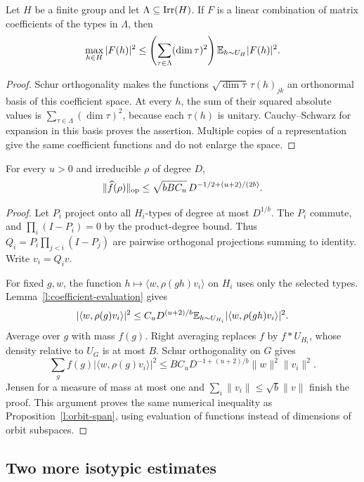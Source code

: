 \begin{lemma}\label{l:coefficient-evaluation}
Let $H$ be a finite group and let $\Lambda\subseteq\operatorname{Irr}(H)$. If $F$ is a linear combination of matrix coefficients of the types in $\Lambda$, then
\[
 \max_{h\in H}|F(h)|^2\le\left(\sum_{\tau\in\Lambda}(\dim\tau)^2\right)\mathbb E_{h\sim U_H}|F(h)|^2.
\]
\end{lemma}
\begin{proof}
Schur orthogonality makes the functions $\sqrt{\dim\tau}\,\tau(h)_{jk}$ an orthonormal basis of this coefficient space. At every $h$, the sum of their squared absolute values is $\sum_{\tau\in\Lambda}(\dim\tau)^2$, because each $\tau(h)$ is unitary. Cauchy--Schwarz for expansion in this basis proves the assertion. Multiple copies of a representation give the same coefficient functions and do not enlarge the space.
\end{proof}

\begin{proposition}\label{l:coefficient-operator}
For every $u>0$ and irreducible $\rho$ of degree $D$,
\[
 \|\widehat f(\rho)\|_{\mathrm{op}}\le\sqrt{bBC_u}\,D^{-1/2+(u+2)/(2b)}.
\]
\end{proposition}
\begin{proof}
Let $P_i$ project onto all $H_i$-types of degree at most $D^{1/b}$. The $P_i$ commute, and $\prod_i(I-P_i)=0$ by the product-degree bound. Thus $Q_i=P_i\prod_{j<i}(I-P_j)$ are pairwise orthogonal projections summing to identity. Write $v_i=Q_iv$.

For fixed $g,w$, the function $h\mapsto\langle w,\rho(gh)v_i\rangle$ on $H_i$ uses only the selected types. Lemma~\ref{l:coefficient-evaluation} gives
\[
 |\langle w,\rho(g)v_i\rangle|^2
 \le C_uD^{(u+2)/b}\mathbb E_{h\sim U_{H_i}}|\langle w,\rho(gh)v_i\rangle|^2.
\]
Average over $g$ with mass $f(g)$. Right averaging replaces $f$ by $f*U_{H_i}$, whose density relative to $U_G$ is at most $B$. Schur orthogonality on $G$ gives
\[
 \sum_gf(g)|\langle w,\rho(g)v_i\rangle|^2
 \le BC_uD^{-1+(u+2)/b}\|w\|^2\|v_i\|^2.
\]
Jensen for a measure of mass at most one and $\sum_i\|v_i\|\le\sqrt b\|v\|$ finish the proof. This argument proves the same numerical inequality as Proposition~\ref{l:orbit-span}, using evaluation of functions instead of dimensions of orbit subspaces.
\end{proof}

\subsection{Two more isotypic estimates}

